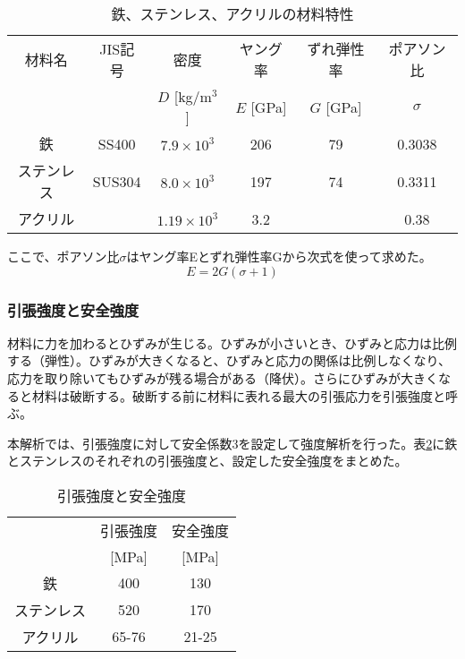 \documentclass[11pt]{ltjsreport}
\newcommand{\tabref}[1]{表\ref{#1}}
\begin{document}
\begin{table}[htbp]
\caption[鉄、ステンレス、アクリルの材料特性]{鉄、ステンレス、アクリルの材料特性}
\begin{center}
\begin{tabular}{cccccc}
\hline \hline
材料名 & JIS記号 & 密度 & ヤング率 & ずれ弾性率 & ポアソン比\\
& & $D$ [kg/m$^{3}$] & $E$ [GPa] & $G$ [GPa] & $\sigma$\\
 \hline
鉄 & SS400 & $7.9 \times 10^{3}$& 206 & 79 & 0.3038\\
ステンレス & SUS304 & $8.0 \times 10^{3}$ & 197 & 74 & 0.3311\\
アクリル & & $1.19 \times 10^{3}$ & 3.2 & & 0.38\\
\hline \hline
\end{tabular}
\end{center}
\label{MaterialProperty}
\end{table}%

ここで、ポアソン比$\sigma$はヤング率Eとずれ弾性率Gから次式を使って求めた。
\begin{equation}
E = 2G(\sigma+1)
\label{PoissonRatio}
\end{equation}

\subsubsection{引張強度と安全強度}
材料に力を加わるとひずみが生じる。ひずみが小さいとき、ひずみと応力は比例する（弾性）。ひずみが大きくなると、ひずみと応力の関係は比例しなくなり、応力を取り除いてもひずみが残る場合がある（降伏）。さらにひずみが大きくなると材料は破断する。破断する前に材料に表れる最大の引張応力を引張強度と呼ぶ。

本解析では、引張強度に対して安全係数3を設定して強度解析を行った。\tabref{SafeStress}に鉄とステンレスのそれぞれの引張強度と、設定した安全強度をまとめた。



\begin{table}[htbp]
\caption[引張強度と安全強度]{引張強度と安全強度}
\begin{center}
\begin{tabular}{ccc}
\hline \hline
& 引張強度 & 安全強度\\
& [MPa] & [MPa] \\
\hline
鉄 & 400 & 130\\
ステンレス & 520 & 170\\
アクリル & 65-76 & 21-25\\
\hline \hline
\end{tabular}
\end{center}
\label{SafeStress}
\end{table}%
\end{document}
